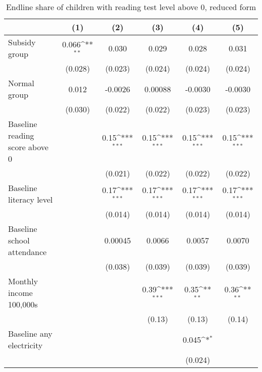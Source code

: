 \begin{table}[htbp]\centering
\def\sym#1{\ifmmode^{#1}\else\(^{#1}\)\fi}
\caption{Endline share of children with reading test level above 0, reduced form}
\begin{tabular*}{1\hsize}{@{\hskip\tabcolsep\extracolsep\fill}l*{5}{c}}
\toprule
                &\multicolumn{1}{c}{(1)}         &\multicolumn{1}{c}{(2)}         &\multicolumn{1}{c}{(3)}         &\multicolumn{1}{c}{(4)}         &\multicolumn{1}{c}{(5)}         \\
\midrule
Subsidy group   &    0.066\sym{**} &    0.030         &    0.029         &    0.028         &    0.031         \\
                &  (0.028)         &  (0.023)         &  (0.024)         &  (0.024)         &  (0.024)         \\
Normal group    &    0.012         &  -0.0026         &  0.00088         &  -0.0030         &  -0.0030         \\
                &  (0.030)         &  (0.022)         &  (0.022)         &  (0.023)         &  (0.023)         \\
Baseline reading score above 0&                  &     0.15\sym{***}&     0.15\sym{***}&     0.15\sym{***}&     0.15\sym{***}\\
                &                  &  (0.021)         &  (0.022)         &  (0.022)         &  (0.022)         \\
Baseline literacy level&                  &     0.17\sym{***}&     0.17\sym{***}&     0.17\sym{***}&     0.17\sym{***}\\
                &                  &  (0.014)         &  (0.014)         &  (0.014)         &  (0.014)         \\
Baseline school attendance&                  &  0.00045         &   0.0066         &   0.0057         &   0.0070         \\
                &                  &  (0.038)         &  (0.039)         &  (0.039)         &  (0.039)         \\
Monthly income 100,000s&                  &                  &     0.39\sym{***}&     0.35\sym{**} &     0.36\sym{**} \\
                &                  &                  &   (0.13)         &   (0.13)         &   (0.14)         \\
Baseline any electricity&                  &                  &                  &    0.045\sym{*}  &                  \\
                &                  &                  &                  &  (0.024)         &                  \\

\end{tabular*}
\end{table}
